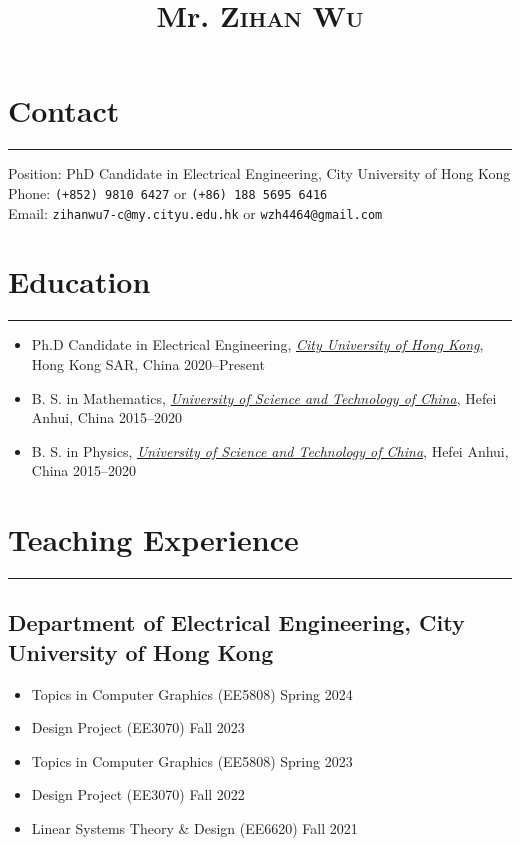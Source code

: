 \documentclass{article}
\title{Mr. \scshape Zihan Wu}
\author{}
\date{}
\newcommand{\cussection}[1]{\vspace{--0.05in}\section*{#1}\vspace{--0.1in} \hrule\vspace{0.2in} }
\begin{document}
\maketitle
\thispagestyle{empty}
\vspace{-0.5in}

\cussection{Contact}
Position: PhD Candidate in Electrical Engineering, City University of Hong Kong\\
Phone: \texttt{(+852) 9810 6427} or \texttt{(+86) 188 5695 6416} \\ %
Email: \texttt{zihanwu7-c@my.cityu.edu.hk} or \texttt{wzh4464@gmail.com}
\cussection{Education}
\begin{itemize}
    \item Ph.D Candidate in Electrical Engineering, \href{https://www.cityu.edu.hk/}{\emph{City University of Hong Kong}}, Hong Kong SAR, China \hfill 2020--Present
    \item B. S. in Mathematics, \href{https://en.ustc.edu.cn/}{\emph{University of Science and Technology of China}}, Hefei Anhui, China \hfill{2015--2020}
    \item B. S. in Physics, \href{https://en.ustc.edu.cn/}{\emph{University of Science and Technology of China}}, Hefei Anhui, China \hfill{2015--2020}
\end{itemize}




\cussection{Teaching Experience}

\subsection*{Department of Electrical Engineering, City University of Hong Kong}

\begin{itemize}
    \item Topics in Computer Graphics (EE5808) \hfill Spring 2024
    \item Design Project (EE3070) \hfill Fall 2023
    \item Topics in Computer Graphics (EE5808) \hfill Spring 2023
    \item Design Project (EE3070) \hfill Fall 2022
    \item Linear Systems Theory \& Design (EE6620) \hfill Fall 2021
\end{itemize}
\end{document}

